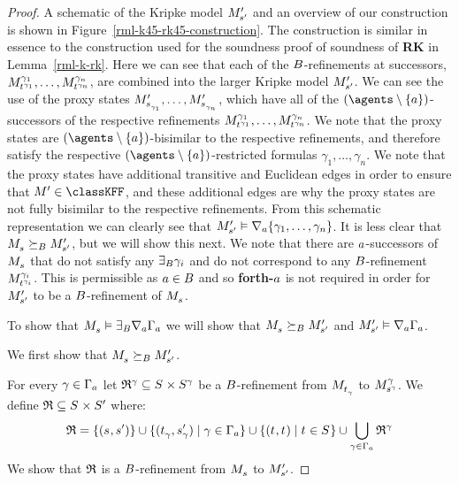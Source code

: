 \begin{proof}
A schematic of the Kripke model $\kPModelP{\kStateSP}$ and an overview of our construction is shown in Figure~\ref{rml-k45-rk45-construction}.
The construction is similar in essence to the construction used for the soundness proof of soundness of {\bf RK} in Lemma~\ref{rml-k-rk}.
Here we can see that each of the $\agentsB$-refinements at successors, $\kPModel[\gamma_1]{\kStateT[\gamma_1]}, \dots, \kPModel[\gamma_n]{\kStateT[\gamma_n]}$, are combined into the larger Kripke model $\kPModelP{\kStateSP}$.
We can see the use of the proxy states $\kPModelP{\kStateS_{\gamma_1}}, \dots, \kPModelP{\kStateS_{\gamma_n}}$, which have all of the $(\agents \setminus \{\agentA\})$-successors of the respective refinements $\kPModel[\gamma_1]{\kStateT[\gamma_1]}, \dots, \kPModel[\gamma_n]{\kStateT[\gamma_n]}$.
We note that the proxy states are $(\agents \setminus \{\agentA\})$-bisimilar to the respective refinements, and therefore satisfy the respective $(\agents \setminus \{\agentA\})$-restricted formulas $\gamma_1, \dots, \gamma_n$.
We note that the proxy states have additional transitive and Euclidean edges in order to ensure that $\kModelP \in \classKFF$, and these additional edges are why the proxy states are not fully bisimilar to the respective refinements.
From this schematic representation we can clearly see that $\kPModelP{\kStateSP} \entails \coversA \{\gamma_1, \dots, \gamma_n\}$.
It is less clear that $\kPModel{\kStateS} \simulatesBs \kPModelP{\kStateSP}$, but we will show this next.
We note that there are $\agentA$-successors of $\kPModel{\kStateS}$ that do not satisfy any $\somerefsBs \gamma_i$ and do not correspond to any $\agentsB$-refinement $\kPModel[\gamma_i]{\kStateT[\gamma_i]}$.
This is permissible as $\agentA \in \agentsB$ and so {\bf forth-$\agentA$} is not required in order for $\kPModelP{\kStateSP}$ to be a $\agentsB$-refinement of $\kPModel{\kStateS}$.

To show that $\kPModel{\kStateS} \entails \somerefsBs \coversA \Gamma_\agentA$ we will show that $\kPModel{\kStateS} \simulatesBs \kPModelP{\kStateSP}$ and $\kPModelP{\kStateSP} \entails \coversA \Gamma_\agentA$.

We first show that $\kPModel{\kStateS} \simulatesBs \kPModelP{\kStateSP}$.

For every $\gamma \in \Gamma_\agentA$ let $\refinement^\gamma \subseteq \kStates \times \kStates[\gamma]$ be a $\agentsB$-refinement from $\kPModel{\kStateT_\gamma}$ to $\kPModel[\gamma]{\kStateS[\gamma]}$.
We define $\refinement \subseteq \kStates \times \kStatesP$ where:
$$
\refinement = \{(\kStateS, \kStateSP)\} \cup \{(\kStateT_\gamma, \kStateSP_\gamma) \mid \gamma \in \Gamma_\agentA\} \cup \{(\kStateT, \kStateT) \mid \kStateT \in \kStates\} \cup \bigcup_{\gamma \in \Gamma_\agentA} \refinement^\gamma
$$
We show that $\refinement$ is a $\agentsB$-refinement from $\kPModel{\kStateS}$ to $\kPModelP{\kStateSP}$.


\end{proof}
